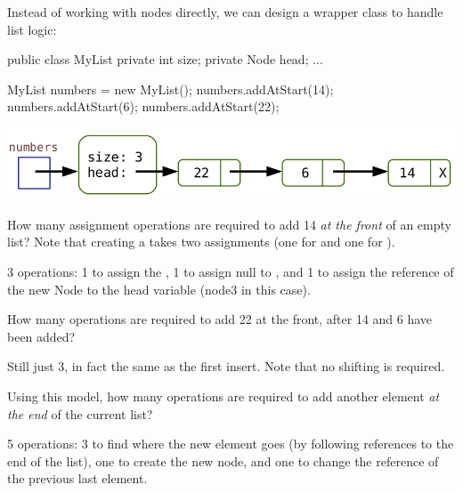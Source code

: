 Instead of working with nodes directly, we can design a wrapper class to handle list logic:

\vspace{1ex}
\begin{minipage}{0.40\linewidth}
\begin{javalst}
    public class MyList
    {
        private int size;
        private Node head;
        ...
    }
\end{javalst}
\end{minipage}
\hfill
\begin{minipage}{0.58\linewidth}
\begin{javalst}
    MyList numbers = new MyList();
    numbers.addAtStart(14);
    numbers.addAtStart(6);
    numbers.addAtStart(22);
\end{javalst}
\includegraphics[scale=0.35]{figs/list3.png}
\end{minipage}
\vspace{1ex}




\Q How many assignment operations are required to add 14 {\it at the front} of an empty list? Note that creating a  takes two assignments (one for  and one for ).

\begin{answer}
3 operations: 1 to assign the , 1 to assign null to , and 1 to assign the reference of the new Node to the head variable (node3 in this case).
\end{answer}


\Q How many operations are required to add 22 at the front, after 14 and 6 have been added?

\begin{answer}
Still just 3, in fact the same as the first insert. Note that no shifting is required.
\end{answer}


\Q Using this model, how many operations are required to add another element {\it at the end} of the current list?

\begin{answer}[3em]
5 operations: 3 to find where the new element goes (by following references to the end of the list), one to create the new node, and one to change the reference of the previous last element.
\end{answer}


